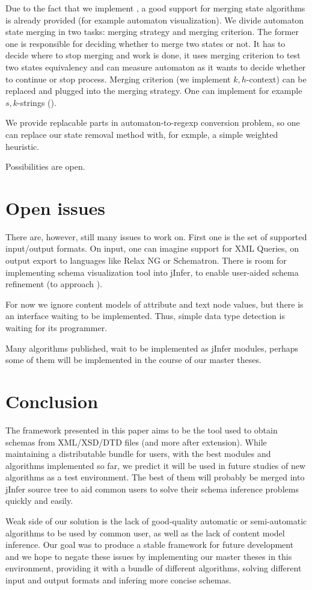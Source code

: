 \documentclass[a4paper,8pt,oneside,twocolumn]{article}
\begin{document}
Due to the fact that we implement \cite{ahonen}, a good support for merging state algorithms is already provided
(for example automaton visualization).
We divide automaton state merging in two tasks: merging strategy and merging criterion.
The former one is responsible for deciding whether to merge two states or not.
It has to decide where to stop merging and work is done, it uses merging criterion to test two states equivalency and can measure automaton as it wants to decide whether to continue or stop process.
Merging criterion (we implement $k,h$-context) can be replaced and plugged into the merging strategy. One can implement for example $s,k$-strings (\cite{Garofalakis:2000:XSE:335191.335409}).

We provide replacable parts in automaton-to-regexp conversion problem, so one can replace our state removal method with, for exmple, a simple weighted heuristic.

Possibilities are open.

\section*{Open issues}
There are, however, still many issues to work on.
First one is the set of supported input/output formats.
On input, one can imagine support for XML Queries, on output export to languages like Relax NG or Schematron. 
There is room for implementing schema visualization tool into jInfer, to enable user-aided schema refinement (to approach \cite{Bex:2008:SSI:1376616.1376750}).

For now we ignore content models of attribute and text node values, but there is an interface waiting to be implemented.
Thus, simple data type detection is waiting for its programmer.

Many algorithms published, wait to be implemented as jInfer modules, perhaps some of them will be implemented in the course of our master theses.

\section*{Conclusion}
The framework presented in this paper aims to be the tool used to obtain schemas from XML/XSD/DTD files (and more after extension).
While maintaining a distributable bundle for users, with the best modules and algorithms implemented so far, we predict it will be used in future studies of new algorithms as a test environment.
The best of them will probably be merged into jInfer source tree to aid common users to solve their schema inference problems quickly and easily.

Weak side of our solution is the lack of good-quality automatic or semi-automatic algorithms to be used by common user, as well as the lack of content model inference.
Our goal was to produce a stable framework for future development and we hope to negate these issues by implementing our master theses in this environment, providing it with a bundle of different algorithms, solving different input and output formats and infering more concise schemas.

\nocite{*}
\newpage


\end{document}
